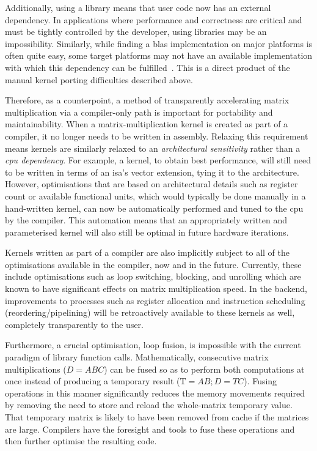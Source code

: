 \documentclass[\main/thesis.tex]{subfiles}
\begin{document}
Additionally, using a library means that user code now has an external dependency.
In applications where performance and correctness are critical and must be tightly controlled by the developer, using libraries may be an impossibility.
Similarly, while finding a \gls{blas} implementation on major platforms is often quite easy, some target platforms may not have an available implementation with which this dependency can be fulfilled~\autocite{zee2016blis}.
This is a direct product of the manual kernel porting difficulties described above.

Therefore, as a counterpoint, a method of transparently accelerating matrix multiplication via a compiler-only path is important for portability and maintainability.
When a matrix-multiplication kernel is created as part of a compiler, it no longer needs to be written in assembly.
Relaxing this requirement means kernels are similarly relaxed to an \emph{architectural sensitivity} rather than a \emph{\gls{cpu} dependency}.
For example, a kernel, to obtain best performance, will still need to be written in terms of an \gls{isa}'s vector extension, tying it to the architecture.
However, optimisations that are based on architectural details such as register count or available functional units, which would typically be done manually in a hand-written kernel, can now be automatically performed and tuned to the \gls{cpu} by the compiler.
This automation means that an appropriately written and parameterised kernel will also still be optimal in future hardware iterations.

Kernels written as part of a compiler are also implicitly subject to all of the optimisations available in the compiler, now and in the future.
Currently, these include optimisations such as loop switching, blocking, and unrolling which are known to have significant effects on matrix multiplication speed.
In the backend, improvements to processes such as register allocation and instruction scheduling (reordering/pipelining) will be retroactively available to these kernels as well, completely transparently to the user.

Furthermore, a crucial optimisation, loop fusion, is impossible with the current paradigm of library function calls.
Mathematically, consecutive matrix multiplications (\eg $D = ABC$) can be fused so as to perform both computations at once instead of producing a temporary result (\ie $\text{T}=AB;D=TC$).
Fusing operations in this manner significantly reduces the memory movements required by removing the need to store and reload the whole-matrix temporary value. That temporary matrix is likely to have been removed from cache if the matrices are large.
Compilers have the foresight and tools to fuse these operations and then further optimise the resulting code.
\end{document}
